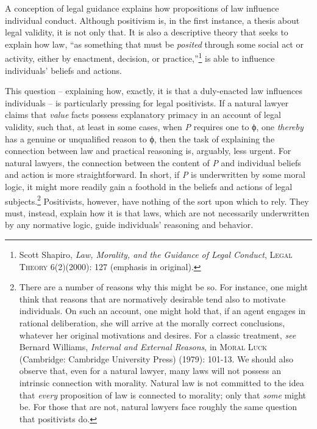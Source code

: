 A conception of legal guidance explains how propositions of law
influence individual conduct. Although positivism is, in the first
instance, a thesis about legal validity, it is not only that. It is also
a descriptive theory that seeks to explain how law, ``as something that
must be \emph{posited} through some social act or activity, either by
enactment, decision, or practice,''\footnote{Scott Shapiro, \emph{Law,
  Morality, and the Guidance of Legal Conduct}, \textsc{Legal Theory}
  6(2)(2000): 127 (emphasis in original).} is able to influence
individuals' beliefs and actions.

This question -- explaining how, exactly, it is that a duly-enacted law
influences individuals -- is particularly pressing for legal
positivists. If a natural lawyer claims that \emph{value} facts possess
explanatory primacy in an account of legal validity, such that, at least
in some cases, when \emph{P} requires one to ϕ, one \emph{thereby} has a
genuine or unqualified reason to ϕ, then the task of explaining the
connection between law and practical reasoning is, arguably, less
urgent. For natural lawyers, the connection between the content of
\emph{P} and individual beliefs and action is more straightforward. In
short, if \emph{P} is underwritten by some moral logic, it might more
readily gain a foothold in the beliefs and actions of legal
subjects.\footnote{There are a number of reasons why this might be so.
  For instance, one might think that reasons that are normatively
  desirable tend also to motivate individuals. On such an account, one
  might hold that, if an agent engages in rational deliberation, she
  will arrive at the morally correct conclusions, whatever her original
  motivations and desires. For a classic treatment, \emph{see} Bernard
  Williams, \emph{Internal and External Reasons}, in \textsc{Moral Luck}
  (Cambridge: Cambridge University Press) (1979): 101-13. We should also
  observe that, even for a natural lawyer, many laws will not possess an
  intrinsic connection with morality. Natural law is not committed to
  the idea that \emph{every} proposition of law is connected to
  morality; only that \emph{some} might be. For those that are not,
  natural lawyers face roughly the same question that positivists do.}
Positivists, however, have nothing of the sort upon which to rely. They
must, instead, explain how it is that laws, which are not necessarily
underwritten by any normative logic, guide individuals' reasoning and
behavior.


